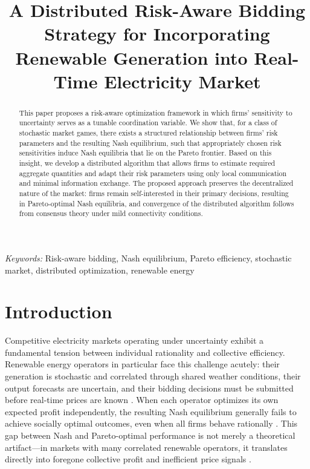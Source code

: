 \documentclass[conference]{IEEEtran}
\title{A Distributed Risk-Aware Bidding Strategy for Incorporating Renewable Generation into Real-Time Electricity Market}
\author{\IEEEauthorblockN{Tommy Truong, Zhihua Qu, and Marwan A. Simaan}
\IEEEauthorblockA{University of Central Florida}}
\begin{document}
\maketitle

\begin{abstract}
This paper proposes a risk-aware optimization framework in which firms' sensitivity to uncertainty serves as a tunable coordination variable. We show that, for a class of stochastic market games, there exists a structured relationship between firms' risk parameters and the resulting Nash equilibrium, such that appropriately chosen risk sensitivities induce Nash equilibria that lie on the Pareto frontier. Based on this insight, we develop a distributed algorithm that allows firms to estimate required aggregate quantities and adapt their risk parameters using only local communication and minimal information exchange. The proposed approach preserves the decentralized nature of the market: firms remain self-interested in their primary decisions, resulting in Pareto-optimal Nash equilibria, and convergence of the distributed algorithm follows from consensus theory under mild connectivity conditions.
\end{abstract}

{\it Keywords:} Risk-aware bidding, Nash equilibrium, Pareto efficiency, stochastic market, distributed optimization, renewable energy 

\section{Introduction}

Competitive electricity markets operating under uncertainty exhibit a fundamental tension between individual rationality and collective efficiency.
Renewable energy operators in particular face this challenge acutely: their generation is stochastic and correlated through shared weather conditions,
their output forecasts are uncertain, and their bidding decisions must be submitted before real-time prices are known
\cite{dvorkin2020chance, wong2007pricing, mieth2020distribution}.
When each operator optimizes its own expected profit independently, the resulting Nash equilibrium generally fails to achieve socially optimal outcomes,
even when all firms behave rationally \cite{zhang2016competition, lee2015rational}.
This gap between Nash and Pareto-optimal performance is not merely a theoretical artifact---in markets with many correlated renewable operators,
it translates directly into foregone collective profit and inefficient price signals \cite{asplund2002risk, wambach1999bertrand}.
\end{document}
